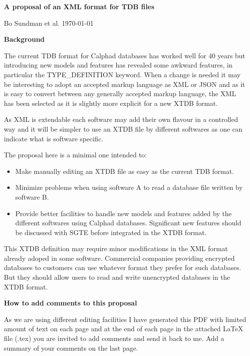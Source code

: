 \documentclass{article}
\begin{document}
\begin{center}

  {\Large \bf A proposal of an XML format for TDB files}

  Bo Sundman et al. \today
\end{center}

\bigskip
{\bf Background}

The current TDB format for Calphad databases has worked well for 40
years but introducing new models and features has revealed some
awkward features, in particular the TYPE\_DEFINITION keyword.  When a
change is needed it may be interesting to adopt an accepted markup
language as XML or JSON and as it is easy to convert between any
generally accepted markup language, the XML has been selected as it is
slightly more explicit for a new XTDB format.

As XML is extendable each software may add their own flavour in a
controlled way and it will be simpler to use an XTDB file by different
softwares as one can indicate what is software specific.

The proposal here is a minimal one intended to:
\begin{itemize}
  \item Make manually editing an XTDB file as easy as the current TDB
    format.
  \item Minimize problems when using software A to read a database
    file written by software B.
  \item Provide better facilities to handle new models and features
    added by the different softwares using Calphad databases.
    Significant new features should be discussed with SGTE before
    integrated in the XTDB format.
\end{itemize}

This XTDB definition may require minor modifications in the XML format
already adoped in some software.  Commercial companies providing
encrypted databases to customers can use whatever format they prefer
for such databases.  But they should allow users to read and write
unencrypted databases in the XTDB format.


\bigskip
{\bf How to add comments to this proposal}

As we are using different editing facilities I have generated this PDF
with limited amount of text on each page and at the end of each page
in the attached LaTeX file (.tex) you are invited to add comments and
send it back to me.  Add a summary of your comments on the last page.
\end{document}
